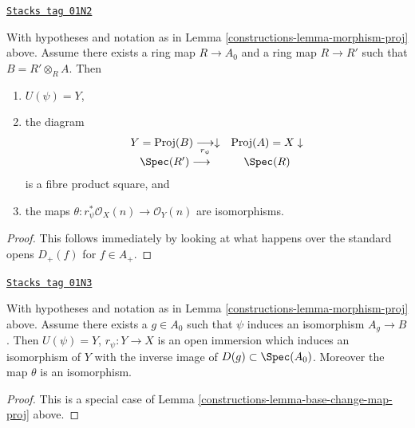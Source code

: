 \begin{lemma}
\label{constructions-lemma-base-change-map-proj}
\href{https://stacks.math.columbia.edu/tag/01N2}{\texttt{Stacks tag 01N2}}

\begin{reference}
\cite[II, Proposition 2.8.10]{EGA}
\end{reference}
With hypotheses and notation as in Lemma \ref{constructions-lemma-morphism-proj} above.
Assume there exists a ring map $R \to A_0$ and a ring map
$R \to R'$ such that $B = R' \otimes_R A$. Then
\begin{enumerate}
\item $U(\psi) = Y$,
\item the diagram
$$
\begin{array}{cc}Y = \text{Proj}(B) \underset{r_\psi}{\longrightarrow}\downarrow & \text{Proj}(A) = X \downarrow \\ \Spec(R') \longrightarrow & \Spec(R)\end{array}
$$
is a fibre product square, and
\item the maps $\theta : r_\psi^*\mathcal{O}_X(n) \to \mathcal{O}_Y(n)$
are isomorphisms.
\end{enumerate}
\end{lemma}

\begin{proof}
This follows immediately by looking at what happens over the standard
opens $D_{+}(f)$ for $f \in A_{+}$.
\end{proof}

\begin{lemma}
\label{constructions-lemma-localization-map-proj}
\href{https://stacks.math.columbia.edu/tag/01N3}{\texttt{Stacks tag 01N3}}

With hypotheses and notation as in Lemma \ref{constructions-lemma-morphism-proj} above.
Assume there exists a $g \in A_0$ such that $\psi$ induces an
isomorphism $A_g \to B$. Then
$U(\psi) = Y$, $r_\psi : Y \to X$ is an open immersion
which induces an isomorphism of $Y$ with the inverse image
of $D(g) \subset \Spec(A_0)$. Moreover the map $\theta$
is an isomorphism.
\end{lemma}

\begin{proof}

This is a special case of Lemma \ref{constructions-lemma-base-change-map-proj} above.
\end{proof}

